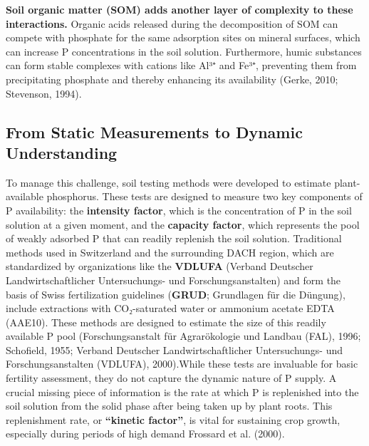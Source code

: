 \documentclass[
  a4paper,
]{article}
\begin{document}
\textbf{Soil organic matter (SOM) adds another layer of complexity to
these interactions.} Organic acids released during the decomposition of
SOM can compete with phosphate for the same adsorption sites on mineral
surfaces, which can increase P concentrations in the soil solution.
Furthermore, humic substances can form stable complexes with cations
like Al³⁺ and Fe³⁺, preventing them from precipitating phosphate and
thereby enhancing its availability (Gerke, 2010; Stevenson, 1994).

\subsection{From Static Measurements to Dynamic
Understanding}\label{from-static-measurements-to-dynamic-understanding}

To manage this challenge, soil testing methods were developed to
estimate plant-available phosphorus. These tests are designed to measure
two key components of P availability: the \textbf{intensity factor},
which is the concentration of P in the soil solution at a given moment,
and the \textbf{capacity factor}, which represents the pool of weakly
adsorbed P that can readily replenish the soil solution. Traditional
methods used in Switzerland and the surrounding DACH region, which are
standardized by organizations like the \textbf{VDLUFA} (Verband
Deutscher Landwirtschaftlicher Untersuchungs- und Forschungsanstalten)
and form the basis of Swiss fertilization guidelines (\textbf{GRUD};
Grundlagen für die Düngung), include extractions with CO₂-saturated
water or ammonium acetate EDTA (AAE10). These methods are designed to
estimate the size of this readily available P pool (Forschungsanstalt
für Agrarökologie und Landbau (FAL), 1996; Schofield, 1955; Verband
Deutscher Landwirtschaftlicher Untersuchungs- und Forschungsanstalten
(VDLUFA), 2000).While these tests are invaluable for basic fertility
assessment, they do not capture the dynamic nature of P supply. A
crucial missing piece of information is the rate at which P is
replenished into the soil solution from the solid phase after being
taken up by plant roots. This replenishment rate, or \textbf{``kinetic
factor''}, is vital for sustaining crop growth, especially during
periods of high demand Frossard et al. (2000).
\end{document}
